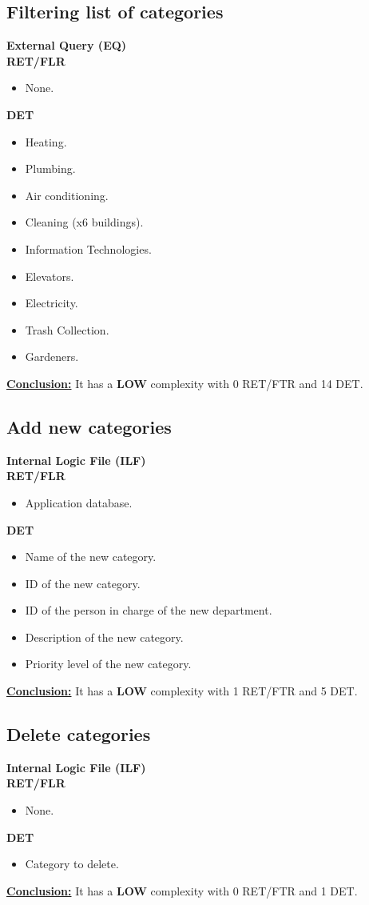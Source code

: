 \subsection{Filtering list of categories}
\textbf{External Query (EQ)} \\ 
\textbf{RET/FLR}
\begin{itemize}
\item None.
\end{itemize}
\textbf{DET}
\begin{itemize}
\item Heating.
\item Plumbing.
\item Air conditioning.
\item Cleaning (x6 buildings).
\item Information Technologies.
\item Elevators.
\item Electricity.
\item Trash Collection.
\item Gardeners.
\end{itemize}
\textbf{\underline{Conclusion:}} It has a \textbf{LOW} complexity with 0 RET/FTR and 14 DET.

\subsection{Add new categories}
\textbf{Internal Logic File (ILF)} \\ 
\textbf{RET/FLR}
\begin{itemize}
\item Application database.
\end{itemize}
\textbf{DET}
\begin{itemize}
\item Name of the new category.
\item ID of the new category.
\item ID of the person in charge of the new department.
\item Description of the new category.
\item Priority level of the new category.

\end{itemize}
\textbf{\underline{Conclusion:}} It has a \textbf{LOW} complexity with 1 RET/FTR and 5 DET.

\subsection{Delete categories}
\textbf{Internal Logic File (ILF)} \\ 
\textbf{RET/FLR}
\begin{itemize}
\item None.
\end{itemize}
\textbf{DET}
\begin{itemize}
\item Category to delete.
\end{itemize}
\textbf{\underline{Conclusion:}} It has a \textbf{LOW} complexity with 0 RET/FTR and 1 DET.

